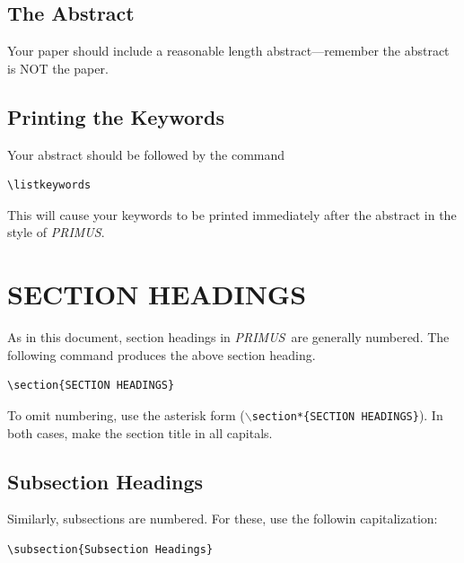 \documentclass{primus}
\newcommand{\PR}{{\it PRIMUS}}
\begin{document}
\subsection{The Abstract}

Your paper  should include a reasonable length abstract---remember the abstract is NOT the paper.

\subsection{Printing the Keywords}

Your abstract should be followed by the command

\begin{verbatim}
\listkeywords
\end{verbatim}

\noindent This will cause your keywords to be printed immediately after the abstract in the style of \PR. 


\section{\label{section:headings}SECTION HEADINGS}

As in this document, section headings in \PR\ are generally  numbered.  The following command produces the above section heading.
\nopagebreak 

\begin{verbatim}
\section{SECTION HEADINGS}
\end{verbatim}

\noindent To omit numbering, use the asterisk form ({\tt $\backslash$section*\{SECTION HEADINGS\}}). In both cases, make the section title in all capitals.

\subsection{Subsection Headings}

Similarly, subsections are  numbered. For these, use the followin capitalization:

\begin{verbatim}
\subsection{Subsection Headings}
\end{verbatim}
\end{document}
